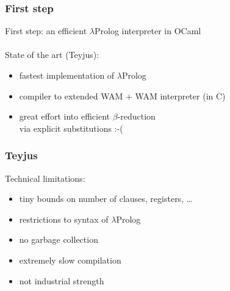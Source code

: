 \documentclass{beamer}
\begin{document}


%

\begin{frame}
 \frametitle{First step}

 First step: an efficient $\lambda$Prolog interpreter in OCaml\\~\\

 State of the art (Teyjus):\\
\begin{itemize}
 \item fastest implementation of $\lambda$Prolog
 \item compiler to extended WAM + WAM interpreter (in C)
 \item great effort into efficient $\beta$-reduction\\
       \vspace{0.15cm}
       \small{via explicit substitutions} :-(
\end{itemize}
\end{frame}

\begin{frame}
 \frametitle{Teyjus}
 Technical limitations:\\
 \begin{itemize}
  \item tiny bounds on number of clauses, registers, \ldots
  \item restrictions to syntax of $\lambda$Prolog
  \item no garbage collection
  \item extremely slow compilation
  \item not industrial strength
 \end{itemize}
\end{frame}
\end{document}
